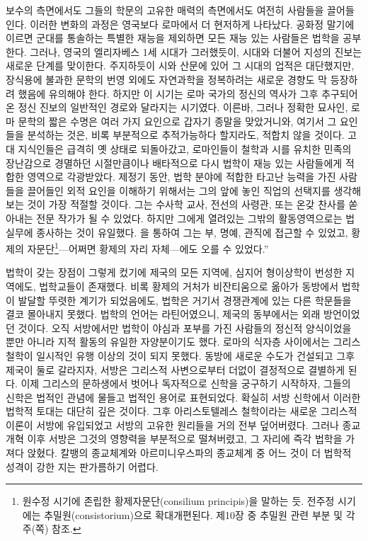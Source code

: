 보수의 측면에서도 그들의 학문의 고유한 매력의 측면에서도
여전히 사람들을 끌어들인다.
이러한 변화의 과정은 영국보다 로마에서 더 현저하게 나타났다.
공화정 말기에 이르면
군대를 통솔하는 특별한 재능을 제외하면
모든 재능 있는 사람들은
법학을 공부한다.
그러나,
영국의 엘리자베스 1세 시대가 그러했듯이,
 시대와 더불어
지성의 진보는 새로운 단계를 맞이한다.
주지하듯이 시와 산문에 있어 그 시대의 업적은 대단했지만,
장식용에 불과한 문학의 번영 외에도
자연과학을 정복하려는 새로운 경향도 막 등장하려 했음에
유의해야 한다.
하지만 이 시기는 로마 국가의 정신의 역사가
그후 추구되어온 정신 진보의 일반적인 경로와 달라지는 시기였다.
이른바, 그러나 정확한 묘사인, 로마 문학의 짧은 수명은
여러 가지 요인으로 갑자기 종말을 맞았거니와,
여기서 그 요인들을 분석하는 것은,
비록 부분적으로 추적가능하다 할지라도,
적합치 않을 것이다.
고대 지식인들은 급격히
옛 상태로 되돌아갔고,
로마인들이 철학과 시를 유치한 민족의 장난감으로 경멸하던 시절만큼이나
배타적으로 다시 법학이
재능 있는 사람들에게 적합한 영역으로 각광받았다.
제정기 동안,
법학 분야에 적합한
타고난 능력을 가진 사람들을 끌어들인
외적 요인을 이해하기 위해서는
그의 앞에 놓인 직업의 선택지를 생각해보는 것이
가장 적절할 것이다.
그는 수사학 교사,
전선의 사령관,
또는 온갖 찬사를 쏟아내는 전문 작가가 될 수 있었다.
하지만 그에게 열려있는 그밖의 활동영역으로는
법실무에 종사하는 것이 유일했다.
을 통하여 그는
부, 명예, 관직에 접근할 수 있었고,
황제의 자문단\footnote{%
  원수정 시기에 존립한 황제자문단(consilium principis)을 말하는 듯.
  전주정 시기에는 추밀원(consistorium)으로 확대개편된다.
  제10장 중 추밀원 관련 부분 및 각주(\pageref{consiliumprincipis}쪽) 참조.
}---어쩌면 황제의 자리 자체---에도
오를 수 있었다.''

법학이 갖는 장점이 그렇게 컸기에
제국의 모든 지역에, 심지어 형이상학이 번성한 지역에도,
법학교들이 존재했다.
비록 황제의 거처가 비잔티움으로 옮아가
동방에서 법학이 발달할 뚜렷한 계기가 되었음에도,
법학은 거기서 경쟁관계에 있는 다른 학문들을 결코 몰아내지 못했다.
법학의 언어는 라틴어였으니,
제국의 동부에서는 외래 방언이었던 것이다.
오직 서방에서만
법학이 야심과 포부를 가진 사람들의 정신적 양식이었을 뿐만 아니라
지적 활동의 유일한 자양분이기도 했다.
로마의 식자층 사이에서는 그리스 철학이
일시적인 유행 이상의 것이 되지 못했다.
동방에 새로운 수도가 건설되고 그후 제국이 둘로 갈라지자,
서방은
그리스적 사변으로부터
더없이 결정적으로
결별하게 된다.
이제 그리스의 문하생에서 벗어나
독자적으로 신학을 궁구하기 시작하자,
그들의 신학은 법적인 관념에 물들고 법적인 용어로 표현되었다.
확실히 서방 신학에서 이러한 법학적 토대는 대단히 깊은 것이다.
그후 아리스토텔레스 철학이라는 새로운 그리스적 이론이
서방에 유입되었고 서방의 고유한 원리들을 거의 전부 덮어버렸다.
그러나
종교개혁 이후 서방은
그것의 영향력을
부분적으로 떨쳐버렸고,
그 자리에 즉각 법학을 가져다 앉혔다.
칼뱅의 종교체계와
아르미니우스파의 종교체계 중
어느 것이 더 법학적 성격이 강한 지는 판가름하기 어렵다.

